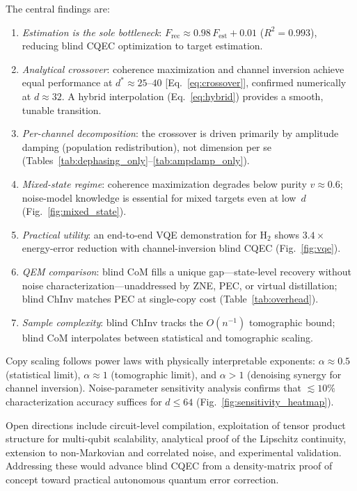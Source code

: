 \documentclass[prx,twocolumn,superscriptaddress,longbibliography,floatfix]{revtex4-2}
\newcommand{\Frec}{F_\mathrm{rec}}
\newcommand{\Fest}{F_\mathrm{est}}
\begin{document}
The central findings are:
\begin{enumerate}
\item \emph{Estimation is the sole bottleneck}: $\Frec \approx 0.98\,\Fest + 0.01$ ($R^2 = 0.993$), reducing blind CQEC optimization to target estimation.
\item \emph{Analytical crossover}: coherence maximization and channel inversion achieve equal performance at $d^* \approx 25$--$40$ [Eq.~\eqref{eq:crossover}], confirmed numerically at $d \approx 32$.
A hybrid interpolation (Eq.~\eqref{eq:hybrid}) provides a smooth, tunable transition.
\item \emph{Per-channel decomposition}: the crossover is driven primarily by amplitude damping (population redistribution), not dimension per se (Tables~\ref{tab:dephasing_only}--\ref{tab:ampdamp_only}).
\item \emph{Mixed-state regime}: coherence maximization degrades below purity $v \approx 0.6$; noise-model knowledge is essential for mixed targets even at low~$d$ (Fig.~\ref{fig:mixed_state}).
\item \emph{Practical utility}: an end-to-end VQE demonstration for H$_2$ shows $3.4\times$ energy-error reduction with channel-inversion blind CQEC (Fig.~\ref{fig:vqe}).
\item \emph{QEM comparison}: blind CoM fills a unique gap---state-level recovery without noise characterization---unaddressed by ZNE, PEC, or virtual distillation; blind ChInv matches PEC at single-copy cost (Table~\ref{tab:overhead}).
\item \emph{Sample complexity}: blind ChInv tracks the $O(n^{-1})$ tomographic bound; blind CoM interpolates between statistical and tomographic scaling.
\end{enumerate}

Copy scaling follows power laws with physically interpretable exponents: $\alpha \approx 0.5$ (statistical limit), $\alpha \approx 1$ (tomographic limit), and $\alpha > 1$ (denoising synergy for channel inversion).
Noise-parameter sensitivity analysis confirms that $\lesssim 10\%$ characterization accuracy suffices for $d \leq 64$ (Fig.~\ref{fig:sensitivity_heatmap}).

Open directions include circuit-level compilation, exploitation of tensor product structure for multi-qubit scalability, analytical proof of the Lipschitz continuity, extension to non-Markovian and correlated noise, and experimental validation.
Addressing these would advance blind CQEC from a density-matrix proof of concept toward practical autonomous quantum error correction.
\end{document}
